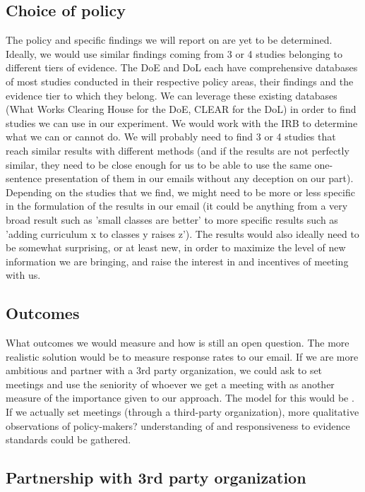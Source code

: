 \documentclass[12pt,final,fleqn]{article}
\theoremstyle{plain}
\begin{document}
\subsection{Choice of policy} \label{sec: Policy}

The policy and specific findings we will report on are yet to be determined. Ideally, we would use similar findings coming from 3 or 4 studies belonging to different tiers of evidence. The DoE and DoL each have comprehensive databases of most studies conducted in their respective policy areas, their findings and the evidence tier to which they belong. We can leverage these existing databases (What Works Clearing House for the DoE, CLEAR for the DoL) in order to find studies we can use in our experiment. 
\bigbreak
We would work with the IRB to determine what we can or cannot do. We will probably need to find 3 or 4 studies that reach similar results with different methods (and if the results are not perfectly similar, they need to be close enough for us to be able to use the same one-sentence presentation of them in our emails without any deception on our part). Depending on the studies that we find, we might need to be more or less specific in the formulation of the results in our email (it could be anything from a very broad result such as 'small classes are better' to more specific results such as 'adding curriculum x to classes y raises z'). The results would also ideally need to be somewhat surprising, or at least new, in order to maximize the level of new information we are bringing, and raise the interest in and incentives of meeting with us.


\subsection{Outcomes} \label{sec: Outcomes}
What outcomes we would measure and how is still an open question. The more realistic solution would be to measure response rates to our email. If we are more ambitious and partner with a 3rd party organization, we could ask to set meetings and use the seniority of whoever we get a meeting with as another measure of the importance given to our approach. The model for this would be \citet{kalla2016campaign}. If we actually set meetings (through a third-party organization), more qualitative observations of policy-makers? understanding of and responsiveness to evidence standards could be gathered. 

\subsection{Partnership with 3rd party organization} \label{sec: Partnership}
\end{document}
